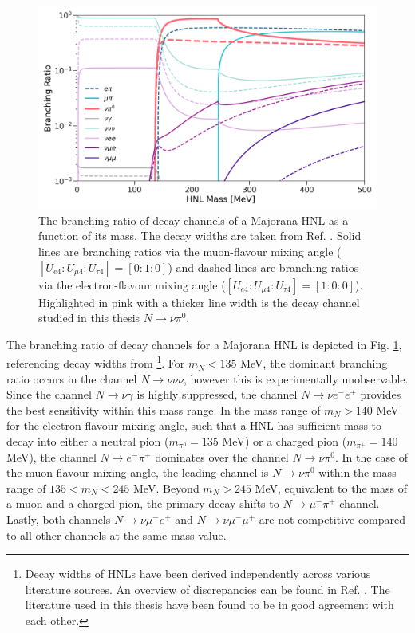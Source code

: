 \begin{figure}[t] 
\centering    
\includegraphics[width=1.0\textwidth]{branching_ratio}
\caption[branching_ratio]{
The branching ratio of decay channels of a Majorana HNL as a function of its mass.
The decay widths are taken from Ref. \cite{HNLBin, SBNHNL, HNLZarko}.
Solid lines are branching ratios via the muon-flavour mixing angle ($[U_{e4}:U_{\mu4}:U_{\tau4}]=[0:1:0]$) and dashed lines are branching ratios via the electron-flavour mixing angle ($[U_{e4}:U_{\mu4}:U_{\tau4}]=[1:0:0]$).
Highlighted in pink with a thicker line width is the decay channel studied in this thesis $N\rightarrow \nu \pi^{0}.$
}
\label{fig:branching_ratio}
\end{figure}

The branching ratio of decay channels for a Majorana HNL is depicted in Fig. \ref{fig:branching_ratio}, referencing decay widths from \cite {HNLBin, SBNHNL, HNLZarko}\footnote{Decay widths of HNLs have been derived independently across various literature sources. An overview of discrepancies can be found in Ref. \cite{HNLZarko}. The literature used in this thesis have been found to be in good agreement with each other.}.
For $m_{N} < 135$ MeV, the dominant branching ratio occurs in the channel $N\rightarrow \nu\nu\nu$, however this is experimentally unobservable.
Since the channel $N\rightarrow \nu \gamma$ is highly suppressed, the channel $N\rightarrow \nu e^{-}e^{+}$ provides the best sensitivity within this mass range.
In the mass range of $m_{N} > 140$ MeV for the electron-flavour mixing angle, such that a HNL has sufficient mass to decay into either a neutral pion ($m_{\pi^{0}}=135$ MeV) or a charged pion ($m_{\pi^{+}}=140$ MeV), the channel $N\rightarrow e^{-}\pi^{+}$ dominates over the channel $N\rightarrow \nu \pi^{0}$.
In the case of the muon-flavour mixing angle, the leading channel is $N\rightarrow \nu \pi^{0}$ within the mass range of $135 < m_{N} < 245 $ MeV.
Beyond $m_{N} > 245$ MeV, equivalent to the mass of a muon and a charged pion, the primary decay shifts to $N\rightarrow \mu^{-}\pi^{+}$ channel. 
Lastly, both channels $N\rightarrow \nu \mu^{-}e^{+}$ and $N\rightarrow \nu \mu^{-}\mu^{+}$ are not competitive compared to all other channels at the same mass value.  

